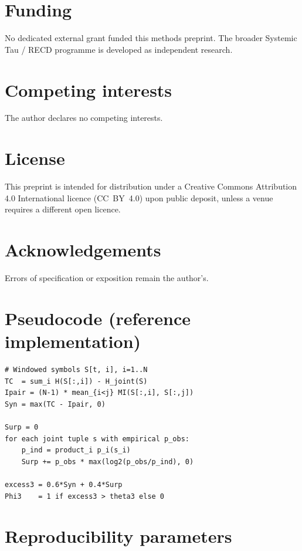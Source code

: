 \documentclass[11pt,a4paper]{article}
\begin{document}
\section*{Funding}

No dedicated external grant funded this methods preprint. The broader
Systemic Tau / RECD programme is developed as independent research.

\section*{Competing interests}

The author declares no competing interests.

\section*{License}

This preprint is intended for distribution under a Creative Commons
Attribution 4.0 International licence (CC~BY~4.0) upon public deposit,
unless a venue requires a different open licence.

\section*{Acknowledgements}

Errors of specification or exposition remain the author's.




\appendix
\section{Pseudocode (reference implementation)}
\label{app:pseudo}

\begin{verbatim}
# Windowed symbols S[t, i], i=1..N
TC  = sum_i H(S[:,i]) - H_joint(S)
Ipair = (N-1) * mean_{i<j} MI(S[:,i], S[:,j])
Syn = max(TC - Ipair, 0)

Surp = 0
for each joint tuple s with empirical p_obs:
    p_ind = product_i p_i(s_i)
    Surp += p_obs * max(log2(p_obs/p_ind), 0)

excess3 = 0.6*Syn + 0.4*Surp
Phi3    = 1 if excess3 > theta3 else 0
\end{verbatim}

\section{Reproducibility parameters}
\label{app:repro}
\end{document}

